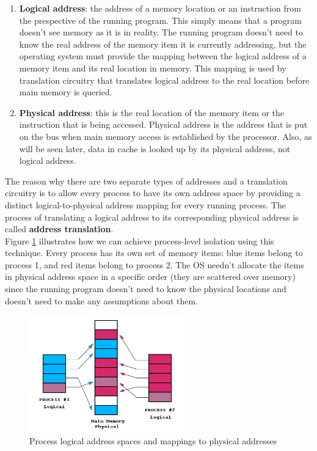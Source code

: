 \documentclass[]{scrartcl}
\begin{document}
\begin{enumerate}

\item \textbf{Logical address}: the address of a memory location or
an instruction from the prespective of the running program. This simply
means that a program doesn't see memory as it is in reality. The
running program doesn't need to know the real address of the memory
item it is currently addressing, but the operating system must
provide the mapping between the logical address of a memory item
and its real location in memory. This mapping is used by translation
circuitry that translates logical address to the real location
before main memory is queried.

\item \textbf{Physical address}: this is the real location of
the memory item or the instruction that is being accessed. Physical
address is the address that is put on the bus when main memory
access is established by the processor. Also, as will be seen later,
data in cache is looked up by its physical address, not
logical address.

\end{enumerate}

The reason why there are two separate types of addresses and a translation
circuitry is to allow every process to have its own address space by
providing a distinct logical-to-physical address mapping for every
running process. The process of translating a logical address
to its corresponding physical address is called 
\textbf{address translation}. \\

Figure \ref{translation} illustrates how we can
achieve process-level isolation using this technique.
Every process has its own set of memory items: blue items belong
to process 1, and red items belong to process 2. The OS needn't
allocate the items in physical address space in a specific order 
(they are scattered over memory) since the running program
doesn't need to know the physical locations and doesn't need
to make any assumptions about them.\\

\begin{figure}[H]
\begin{center}
\includegraphics[width=0.6\textwidth]{translation.png}
\end{center}
\caption{Process logical address spaces and mappings to physical addresses}
\label{translation}
\end{figure}
\end{document}
